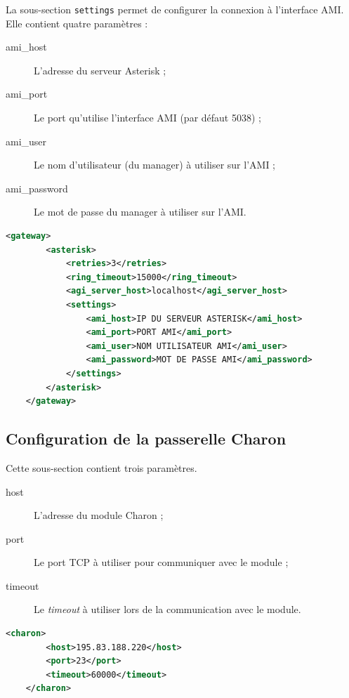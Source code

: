 \documentclass{article}
\begin{document}
La sous-section \texttt{settings} permet de configurer la connexion à l'interface AMI. Elle contient quatre paramètres :

\begin{description}
    \item[ami\_host] L'adresse du serveur Asterisk ;
    \item[ami\_port] Le port qu'utilise l'interface AMI (par défaut 5038) ;
    \item[ami\_user] Le nom d'utilisateur (du manager) à utiliser sur l'AMI ;
    \item[ami\_password] Le mot de passe du manager à utiliser sur l'AMI.
\end{description}

\begin{lstlisting}[language=xml,name=Configuration de l'AMI]
    <gateway>
        <asterisk>
            <retries>3</retries>
            <ring_timeout>15000</ring_timeout>
            <agi_server_host>localhost</agi_server_host>
            <settings>
                <ami_host>IP DU SERVEUR ASTERISK</ami_host>
                <ami_port>PORT AMI</ami_port>
                <ami_user>NOM UTILISATEUR AMI</ami_user>
                <ami_password>MOT DE PASSE AMI</ami_password>
            </settings>
        </asterisk>
    </gateway>
\end{lstlisting}

\subsection{Configuration de la passerelle Charon}

Cette sous-section contient trois paramètres.

\begin{description}
    \item[host] L'adresse du module Charon ;
    \item[port] Le port TCP à utiliser pour communiquer avec le module ;
    \item[timeout] Le \emph{timeout} à utiliser lors de la communication avec le module.
\end{description}

\begin{lstlisting}[language=xml,name=Configuration de l'accès au module Charon I]
    <charon>
        <host>195.83.188.220</host>
        <port>23</port>
        <timeout>60000</timeout>
    </charon>
\end{lstlisting}
\end{document}
